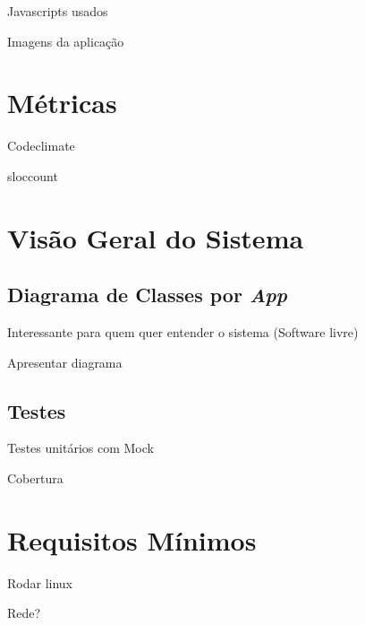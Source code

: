 Javascripts usados

Imagens da aplicação
\section{Métricas}
Codeclimate

sloccount

\section{Visão Geral do Sistema}
    \subsection{Diagrama de Classes por \textit{App}}
    Interessante para quem quer entender o sistema (Software livre)

    Apresentar diagrama
    \subsection{Testes}
    Testes unitários com Mock

    Cobertura
    \section{Requisitos Mínimos}
    Rodar linux

    Rede?
